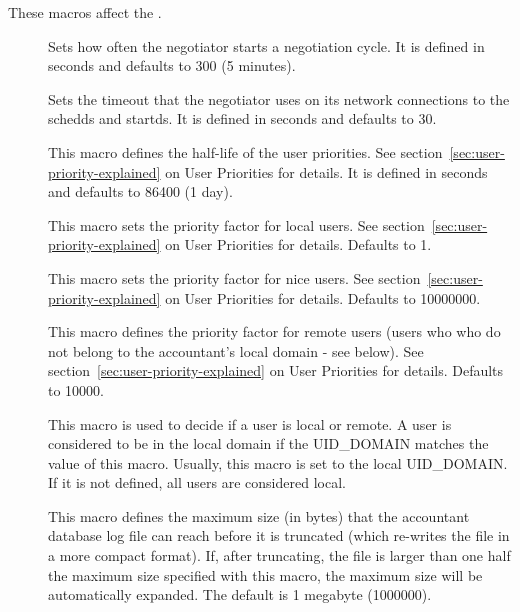 These macros affect the .
\begin{description}
  
\item[] \label{param:NegotiatorInterval}
  Sets how often the negotiator starts a negotiation cycle.  It is defined
  in seconds and defaults to 300 (5 minutes).
  
\item[] \label{param:NegotiatorTimeout}
  Sets the timeout that the negotiator uses on its network connections
  to the schedds and startds.  It is defined in seconds and defaults to 30.
  
\item[] \label{param:PriorityHalfLife} This
  macro defines the half-life of the user priorities.  See
  section~\ref{sec:user-priority-explained}
  on User Priorities for details.  It is defined in seconds and defaults
  to 86400 (1 day).

\item[] \label{param:DefaultPrioFactor} 
  This macro sets the priority factor for local users. See
  section~\ref{sec:user-priority-explained}
  on User Priorities for details.  Defaults to 1.

\item[] \label{param:NiceUserPrioFactor} 
  This macro sets the priority factor for nice users. See
  section~\ref{sec:user-priority-explained}
  on User Priorities for details.  Defaults to 10000000.

\item[] \label{param:RemotePrioFactor} 
  This macro defines the priority factor for remote users (users who
  who do not belong to the accountant's local domain - see
  below). See section~\ref{sec:user-priority-explained}
  on User Priorities for details.  Defaults to 10000.

\item[] \label{param:AccountantLocalDomain} 
  This macro is used to decide if a user is local or remote. A user
  is considered to be in the local domain if the UID\_DOMAIN matches
  the value of this macro. Usually, this macro is set
  to the local UID\_DOMAIN. If it is not defined, all users are considered
  local.

\item[] 
  \label{param:MaxAccountantDatabaseSize}
  This macro defines the maximum size (in bytes) that the accountant
  database log file can reach before it is truncated (which re-writes
  the file in a more compact format).
  If, after truncating, the file is larger than one half the maximum
  size specified with this macro, the maximum size will be
  automatically expanded.
  The default is 1 megabyte (1000000).


\end{description}
